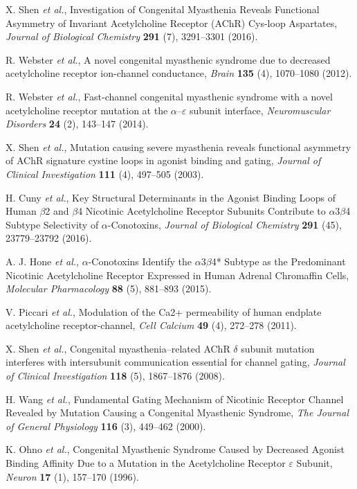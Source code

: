 X. Shen {\em et al.}, Investigation of Congenital Myasthenia Reveals Functional Asymmetry of Invariant Acetylcholine Receptor (AChR) Cys-loop Aspartates, {\em Journal of Biological Chemistry} {\bf 291} (7), 3291--3301 (2016).

R. Webster {\em et al.}, A novel congenital myasthenic syndrome due to decreased acetylcholine receptor ion-channel conductance, {\em Brain} {\bf 135} (4), 1070--1080 (2012).

R. Webster {\em et al.}, Fast-channel congenital myasthenic syndrome with a novel acetylcholine receptor mutation at the $\alpha$--$\varepsilon$ subunit interface, {\em Neuromuscular Disorders} {\bf 24} (2), 143--147 (2014).

X. Shen {\em et al.}, Mutation causing severe myasthenia reveals functional asymmetry of AChR signature cystine loops in agonist binding and gating, {\em Journal of Clinical Investigation} {\bf 111} (4), 497--505 (2003).

H. Cuny {\em et al.}, Key Structural Determinants in the Agonist Binding Loops of Human $\beta$2 and $\beta$4 Nicotinic Acetylcholine Receptor Subunits Contribute to $\alpha$3$\beta$4 Subtype Selectivity of $\alpha$-Conotoxins, {\em Journal of Biological Chemistry} {\bf 291} (45), 23779--23792 (2016).

A. J. Hone {\em et al.}, $\alpha$-Conotoxins Identify the $\alpha$3$\beta$4* Subtype as the Predominant Nicotinic Acetylcholine Receptor Expressed in Human Adrenal Chromaffin Cells, {\em Molecular Pharmacology} {\bf 88} (5), 881--893 (2015).

V. Piccari {\em et al.}, Modulation of the Ca2+ permeability of human endplate acetylcholine receptor-channel, {\em Cell Calcium} {\bf 49} (4), 272--278 (2011).

X. Shen {\em et al.}, Congenital myasthenia--related AChR $\delta$ subunit mutation interferes with intersubunit communication essential for channel gating, {\em Journal of Clinical Investigation} {\bf 118} (5), 1867--1876 (2008).

H. Wang {\em et al.}, Fundamental Gating Mechanism of Nicotinic Receptor Channel Revealed by Mutation Causing a Congenital Myasthenic Syndrome, {\em The Journal of General Physiology} {\bf 116} (3), 449--462 (2000).

K. Ohno {\em et al.}, Congenital Myasthenic Syndrome Caused by Decreased Agonist Binding Affinity Due to a Mutation in the Acetylcholine Receptor $\varepsilon$ Subunit, {\em Neuron} {\bf 17} (1), 157--170 (1996).

